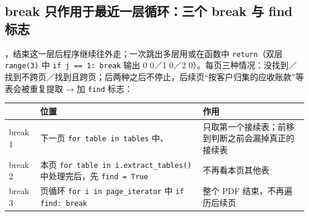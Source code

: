 \subsection{break 只作用于最近一层循环：三个 break 与 find 标志}
，结束这一层后程序继续往外走；一次跳出多层用或在函数中 \texttt{return}（双层 \texttt{range(3)} 中 \texttt{if j == 1: break} 输出 0 0／1 0／2 0）。每页三种情况：没找到／找到不跨页／找到且跨页；后两种之后不停止，后续页“按客户归集的应收账款”等表会被重复提取 → 加 \texttt{find} 标志：
\begin{tabD07}
\begin{tabularx}{\linewidth}{@{}p{0.9cm}p{6.4cm}L@{}}
\toprule
 & 位置 & 作用 \\
\midrule
break 1 & 下一页 \texttt{for table in tables} 中、 & 只取第一个接续表；前移到判断之前会漏掉真正的接续表 \\
break 2 & 本页 \texttt{for table in i.extract\_tables()} 中处理完后，先 \texttt{find = True} & 不再看本页其他表 \\
break 3 & 页循环 \texttt{for i in page\_iterator} 中 \texttt{if find: break} & 整个 PDF 结束，不再遍历后续页 \\
\bottomrule
\end{tabularx}
\end{tabD07}

